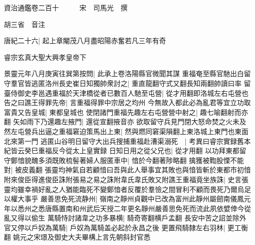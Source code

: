 






























































資治通鑑卷二百十　　　宋　司馬光　撰

胡三省　音注

唐紀二十六|{
	起上章閹茂八月盡昭陽赤奮若凡三年有奇}


睿宗玄真大聖大興孝皇帝下

景靈元年八月庚寅往巽第按問|{
	此承上卷洛陽縣官微聞其謀}
重福奄至縣官馳出白留守羣官皆逃匿洛州長史崔日知獨帥衆討之|{
	重直龍翻守式又翻長知兩翻帥讀曰率}
留臺侍御史李邕遇重福於天津橋從者已數百人馳至屯營|{
	從才用翻即洛城左右屯營也}
告之曰譙王得罪先帝|{
	言重福得罪中宗居之均州}
今無故入都此必為亂君等宜立功取富貴又告皇城|{
	東都皇城也}
使閉諸門重福先趣左右屯營營中射之|{
	趣七喻翻射而亦翻}
矢如雨下乃還趣左掖門|{
	還從宣翻掖音亦}
欲取留守兵見門閉大怒命焚之火未及然左屯營兵出逼之重福窘迫策馬出上東|{
	然與燃同窘渠隕翻上東洛城上東門也東面北來第一門}
逃匿山谷明日留守大出兵搜捕重福赴漕渠溺死　|{
	考異曰睿宗實録舊本紀皆云癸巳重福反今從太上皇實録}
日知日用之從父兄也|{
	從才用翻}
以功拜東都留守鄭愔貌醜多須既敗梳髻著婦人服匿車中|{
	愔於今翻著陟略翻}
擒獲被鞫股慄不能對|{
	被皮義翻}
張靈均神氣自若顧愔曰吾與此人舉事宜其敗也與愔皆斬於東都市初愔附來俊臣得進俊臣誅附張易之易之誅附韋氏韋氏敗又附譙王重福竟坐族誅|{
	史言張靈均雖幸禍好亂之人猶能臨死不變鄭愔者反覆於羣憸之間冒利不顧而畏死乃爾烏足以權大事乎}
嚴善思免死流静州|{
	嶺南之靜州貞觀中已改為富州此靜州屬劒南儀鳳元年以悉州之悉唐縣置南和州武后天授二年更名靜州嚴善思免死而流此夙依嬖倖今從亂又得以偷生}
萬騎恃討諸韋之功多暴横|{
	騎奇寄翻横戶孟翻}
長安中苦之詔並除外官又停以戶奴為萬騎|{
	戶奴為萬騎盖必起於永昌之後}
更置飛騎隸左右羽林|{
	更工衡翻}
姚元之宋璟及御史大夫畢構上言先朝斜封官悉

